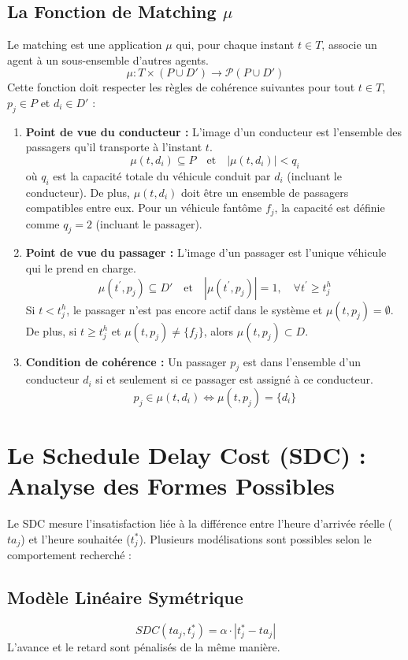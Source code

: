 \documentclass[12pt, a4paper]{article}
\begin{document}
\subsection{La Fonction de Matching $\mu$}
Le matching est une application $\mu$ qui, pour chaque instant $t \in T$, associe un agent à un sous-ensemble d'autres agents.
$$ \mu: T \times (P \cup D') \to \mathcal{P}(P \cup D') $$
Cette fonction doit respecter les règles de cohérence suivantes pour tout $t \in T$, $p_j \in P$ et $d_i \in D'$ :
\begin{enumerate}
    \item \textbf{Point de vue du conducteur :} L'image d'un conducteur est l'ensemble des passagers qu'il transporte à l'instant $t$.
    $$ \mu(t, d_i) \subseteq P \quad \text{et} \quad |\mu(t, d_i)| < q_i $$
    où $q_i$ est la capacité totale du véhicule conduit par $d_i$ (incluant le conducteur). De plus, $\mu(t, d_i)$ doit être un ensemble de passagers compatibles entre eux. Pour un véhicule fantôme $f_j$, la capacité est définie comme $q_j = 2$ (incluant le passager).

    \item \textbf{Point de vue du passager :} L'image d'un passager est l'unique véhicule qui le prend en charge.
    $$ \mu(t^\prime, p_j) \subseteq D' \quad \text{et} \quad |\mu(t^\prime, p_j)| = 1, \quad \forall t^\prime \geq t_j^h $$
    Si $t < t_j^h$, le passager n'est pas encore actif dans le système et $\mu(t, p_j) = \emptyset$. De plus, si $t \geq t_j^h$ et $\mu(t, p_j) \neq \{f_j\}$, alors $\mu(t, p_j) \subset D$.

    \item \textbf{Condition de cohérence :} Un passager $p_j$ est dans l'ensemble d'un conducteur $d_i$ si et seulement si ce passager est assigné à ce conducteur.
    $$ p_j \in \mu(t, d_i) \iff \mu(t, p_j) = \{d_i\} $$
\end{enumerate}

\section{Le Schedule Delay Cost (SDC) : Analyse des Formes Possibles}
Le SDC mesure l'insatisfaction liée à la différence entre l'heure d'arrivée réelle ($ta_j$) et l'heure souhaitée ($t^*_j$). Plusieurs modélisations sont possibles selon le comportement recherché :

\subsection{Modèle Linéaire Symétrique}
$$ SDC(ta_j, t^*_j) = \alpha \cdot |t^*_j - ta_j| $$
L'avance et le retard sont pénalisés de la même manière.
\end{document}
